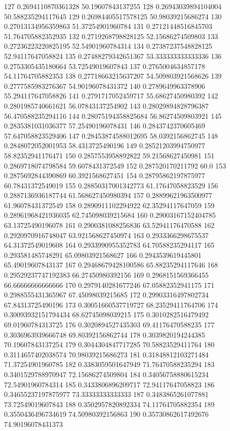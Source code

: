 {127 0.2694110870361328 50.19607843137255
128 0.26943039894104004 50.588235294117645
129 0.26984405517578125 50.98039215686274
130 0.27013134956359863 51.37254901960784
131 0.27121448516845703 51.764705882352935
132 0.2719268798828125 52.15686274509803
133 0.27236223220825195 52.54901960784314
134 0.27387237548828125 52.94117647058824
135 0.27488279342651367 53.333333333333336
136 0.2753305435180664 53.72549019607843
137 0.2765004634857178 54.11764705882353
138 0.27718663215637207 54.509803921568626
139 0.2777585983276367 54.90196078431372
140 0.2789649963378906 55.294117647058826
141 0.2791717052459717 55.68627450980392
142 0.2801985740661621 56.07843137254902
143 0.28029894828796387 56.470588235294116
144 0.28075194358825684 56.86274509803921
145 0.2835381031036377 57.25490196078431
146 0.2843742370605469 57.647058823529406
147 0.28453874588012695 58.0392156862745
148 0.2848072052001953 58.4313725490196
149 0.28521203994750977 58.82352941176471
150 0.2857553958892822 59.21568627450981
151 0.2869718074798584 59.6078431372549
152 0.287520170211792 60.0
153 0.2875692844390869 60.3921568627451
154 0.28795862197875977 60.78431372549019
155 0.28850317001342773 61.17647058823529
156 0.2887136936187744 61.568627450980394
157 0.28899621963500977 61.96078431372549
158 0.2890911102294922 62.35294117647059
159 0.28961968421936035 62.745098039215684
160 0.29003167152404785 63.13725490196078
161 0.2900381088256836 63.52941176470588
162 0.2920970916748047 63.921568627450974
163 0.2933366298675537 64.31372549019608
164 0.2933990955352783 64.70588235294117
165 0.293581485748291 65.09803921568627
166 0.2943539619445801 65.49019607843137
167 0.29468679428100586 65.88235294117646
168 0.29529237747192383 66.27450980392156
169 0.2968151569366455 66.66666666666666
170 0.2979140281677246 67.05882352941175
171 0.2988555431365967 67.45098039215685
172 0.29903316497802734 67.84313725490196
173 0.30051660537719727 68.23529411764706
174 0.30093932151794434 68.62745098039215
175 0.3010282516479492 69.01960784313725
176 0.3020894527435303 69.41176470588235
177 0.3036963939666748 69.80392156862744
178 0.3039820194244385 70.19607843137254
179 0.3044304847717285 70.58823529411764
180 0.3114657402038574 70.98039215686273
181 0.31848812103271484 71.37254901960785
182 0.3383059501647949 71.76470588235294
183 0.3401529788970947 72.15686274509804
184 0.34056758880615234 72.54901960784314
185 0.3433806896209717 72.94117647058823
186 0.34655237197875977 73.33333333333333
187 0.3483865261077881 73.72549019607843
188 0.3502957820892334 74.11764705882354
189 0.3550436496734619 74.50980392156863
190 0.35730862617492676 74.90196078431373
}

